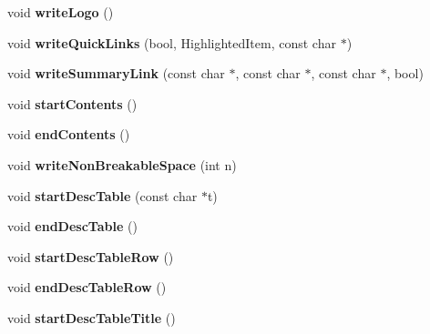 \begin{DoxyCompactItemize}
\item 
\mbox{\label{class_man_generator_abc49b9aa742057e1cbbea917451de6d7}} 
void {\bfseries write\+Logo} ()
\item 
\mbox{\label{class_man_generator_aa821cd7a40d325d026c59dbd78221b98}} 
void {\bfseries write\+Quick\+Links} (bool, Highlighted\+Item, const char $\ast$)
\item 
\mbox{\label{class_man_generator_a984f33b43c990060e1472c97ed167304}} 
void {\bfseries write\+Summary\+Link} (const char $\ast$, const char $\ast$, const char $\ast$, bool)
\item 
\mbox{\label{class_man_generator_a3e53f87fe3a92cd4116370bb3207f2aa}} 
void {\bfseries start\+Contents} ()
\item 
\mbox{\label{class_man_generator_ad218e5e4ee607d35a82476f6866d3dc0}} 
void {\bfseries end\+Contents} ()
\item 
\mbox{\label{class_man_generator_ab73e17675d0c5ce30b48c9815c60ba74}} 
void {\bfseries write\+Non\+Breakable\+Space} (int n)
\item 
\mbox{\label{class_man_generator_a7af24abd8f1dc66da50b6e515e12ed68}} 
void {\bfseries start\+Desc\+Table} (const char $\ast$t)
\item 
\mbox{\label{class_man_generator_a0d3eea58e70d7213f199e3ed11d490dc}} 
void {\bfseries end\+Desc\+Table} ()
\item 
\mbox{\label{class_man_generator_ab708ee610915ba3e49dda52bce9bf445}} 
void {\bfseries start\+Desc\+Table\+Row} ()
\item 
\mbox{\label{class_man_generator_ac08decc953a056c4753a9762f5ecf797}} 
void {\bfseries end\+Desc\+Table\+Row} ()
\item 
\mbox{\label{class_man_generator_a43e02986b96420b036ba2204db980994}} 
void {\bfseries start\+Desc\+Table\+Title} ()
\item 

\end{DoxyCompactItemize}
